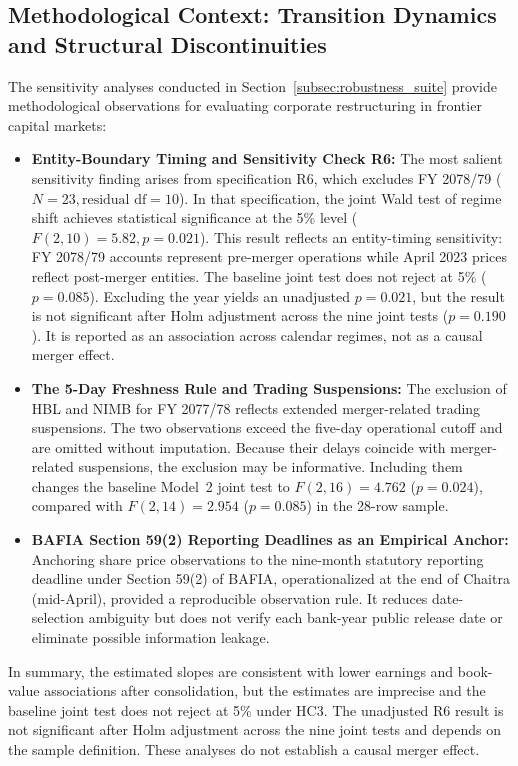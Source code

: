 \subsection{Methodological Context: Transition Dynamics and Structural Discontinuities}
The sensitivity analyses conducted in Section~\ref{subsec:robustness_suite} provide methodological observations for evaluating corporate restructuring in frontier capital markets:
\begin{itemize}
    \item \textbf{Entity-Boundary Timing and Sensitivity Check R6:}
    The most salient sensitivity finding arises from specification R6, which excludes FY 2078/79 ($N = 23, \text{residual df} = 10$). In that specification, the joint Wald test of regime shift achieves statistical significance at the 5\% level ($F(2, 10) = 5.82, p = 0.021$). This result reflects an entity-timing sensitivity: FY 2078/79 accounts represent pre-merger operations while April 2023 prices reflect post-merger entities. The baseline joint test does not reject at 5\% ($p=0.085$). Excluding the year yields an unadjusted $p=0.021$, but the result is not significant after Holm adjustment across the nine joint tests ($p=0.190$). It is reported as an association across calendar regimes, not as a causal merger effect.
    \item \textbf{The 5-Day Freshness Rule and Trading Suspensions:}
    The exclusion of HBL and NIMB for FY 2077/78 reflects extended merger-related trading suspensions. The two observations exceed the five-day operational cutoff and are omitted without imputation. Because their delays coincide with merger-related suspensions, the exclusion may be informative. Including them changes the baseline Model~2 joint test to $F(2,16)=4.762$ ($p=0.024$), compared with $F(2,14)=2.954$ ($p=0.085$) in the 28-row sample.
    \item \textbf{BAFIA Section 59(2) Reporting Deadlines as an Empirical Anchor:}
    Anchoring share price observations to the nine-month statutory reporting deadline under Section 59(2) of BAFIA, operationalized at the end of Chaitra (mid-April), provided a reproducible observation rule. It reduces date-selection ambiguity but does not verify each bank-year public release date or eliminate possible information leakage.
\end{itemize}

In summary, the estimated slopes are consistent with lower earnings and book-value associations after consolidation, but the estimates are imprecise and the baseline joint test does not reject at 5\% under HC3. The unadjusted R6 result is not significant after Holm adjustment across the nine joint tests and depends on the sample definition. These analyses do not establish a causal merger effect.

